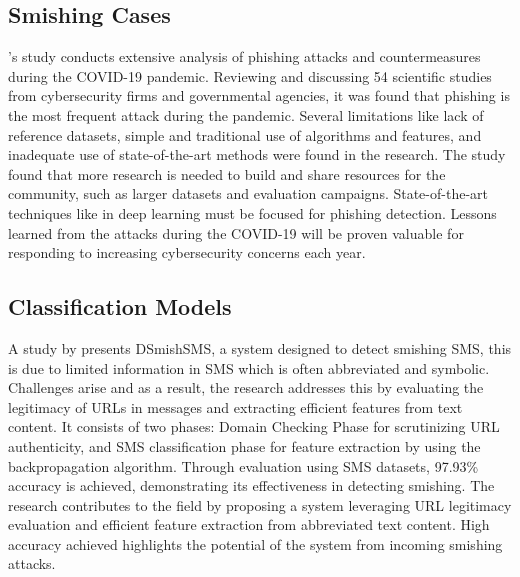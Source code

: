 \documentclass[conference]{IEEEtran}
\begin{document}
\subsection*{Smishing Cases}

\cite{alqahtani2022}'s study conducts extensive analysis of phishing attacks and countermeasures during the COVID-19 pandemic. Reviewing and discussing 54 scientific studies from cybersecurity firms and governmental agencies, it was found that phishing is the most frequent attack during the pandemic. Several limitations like lack of reference datasets, simple and traditional use of algorithms and features, and inadequate use of state-of-the-art methods were found in the research. The study found that more research is needed to build and share resources for the community, such as larger datasets and evaluation campaigns. State-of-the-art techniques like in deep learning must be focused for phishing detection. Lessons learned from the attacks during the COVID-19 will be proven valuable for responding to increasing cybersecurity concerns each year.

\subsection*{Classification Models}
A study by \cite{mishra2021} presents DSmishSMS, a system designed to detect smishing SMS, this is due to limited information in SMS which is often abbreviated and symbolic. Challenges arise and as a result, the research addresses this by evaluating the legitimacy of URLs in messages and extracting efficient features from text content. It consists of two phases: Domain Checking Phase for scrutinizing URL authenticity, and SMS classification phase for feature extraction by using the backpropagation algorithm. Through evaluation using SMS datasets, 97.93\% accuracy is achieved, demonstrating its effectiveness in detecting smishing. The research contributes to the field by proposing a system leveraging URL legitimacy evaluation and efficient feature extraction from abbreviated text content. High accuracy achieved highlights the potential of the system from incoming smishing attacks.
\end{document}
